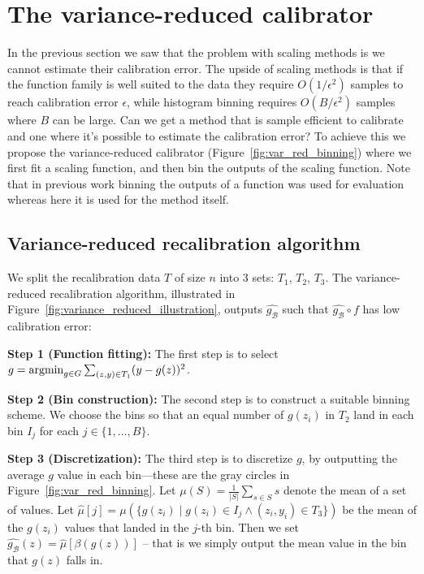 \section{The variance-reduced calibrator}
\label{sec:calibrating_models}

In the previous section we saw that the problem with scaling methods is we cannot estimate their calibration error. The upside of scaling methods is that if the function family is well suited  to the data they require $O(1/\epsilon^2)$ samples to reach calibration error $\epsilon$, while histogram binning requires $O(B/\epsilon^2)$ samples where $B$ can be large. Can we get a method that is sample efficient to calibrate and one where it's possible to estimate the calibration error? To achieve this\pl{,} we propose the variance-reduced calibrator (Figure~\ref{fig:var_red_binning}) where we first fit a scaling function, and then bin the outputs of the scaling function. Note that in previous work binning the outputs of a function was used for evaluation whereas here it is used for the method itself.

\subsection{Variance-reduced recalibration algorithm}

We split the recalibration data $T$ of size $n$ into 3 sets: $T_1$, $T_2$, $T_3$. The variance-reduced recalibration algorithm, illustrated in Figure~\ref{fig:variance_reduced_illustration}, outputs $\hat{g_{\mathcal{B}}}$ such that $\hat{g_{\mathcal{B}}} \circ f$ has low calibration error:

\textbf{Step 1 (Function fitting):} The first step is to select $g = \mathop{\mbox{argmin}}_{g \in G} \sum_{(z, y) \in T_1} (y - g(z))^2$.

\textbf{Step 2 (Bin construction):} The second step is to construct a suitable binning scheme. We choose the bins so that an equal number of $g(z_i)$ in $T_2$ land in each bin $I_j$ for each $j \in \{1, \dots, B\}$.

\textbf{Step 3 (Discretization):} The third step is to discretize $g$, by outputting the average $g$ value in each bin---these are the gray circles in Figure~\ref{fig:var_red_binning}. Let $\mu(S) = \frac{1}{|S|} \sum_{s \in S} s$ denote the mean of a set of values.
Let $\hat{\mu}[j] = \mu(\{ g(z_i) \; | \; g(z_i) \in I_j \wedge (z_i, y_i) \in T_3 \})$ be the mean of the $g(z_i)$ values that landed in the $j$-th bin.
Then we set $\hat{g_{\mathcal{B}}}(z) = \hat{\mu}[\beta(g(z))]$ -- that is we simply output the mean value in the bin that $g(z)$ falls in.

